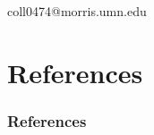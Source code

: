 \documentclass{beamer}
\newcommand{\linespace}{\vskip 0.25cm}
\begin{document}
\begin{frame}
\frametitle{}
{
\cite{FINCH:2011}
\cite{Assembly:2010}
}
\begin{center}
coll0474@morris.umn.edu
\\
\linespace
\linespace
{}
\end{center}

\end{frame}




\section*{References}

\begin{frame} 
	\frametitle{References} 
	
	
\end{frame} 
\end{document}
